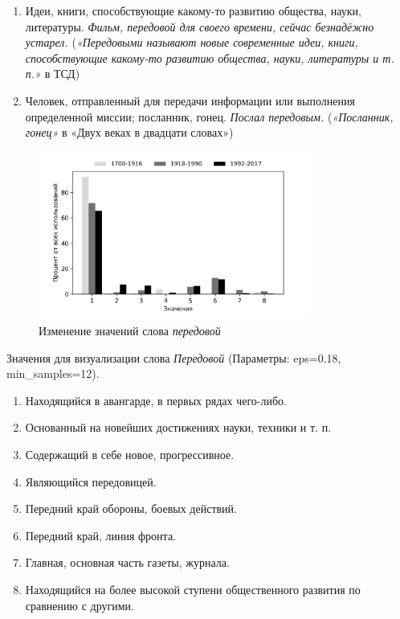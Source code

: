 \begin{enumerate}
    \item Идеи, книги, способствующие какому-то развитию общества, науки, литературы. \textit{Фильм, передовой для своего времени, сейчас безнадёжно устарел.}
(\textit{«Передовыми называют новые современные идеи, книги, способствующие какому-то развитию общества, науки, литературы и т. п.»} в ТСД)

    \item Человек, отправленный для передачи информации или выполнения определенной миссии; посланник, гонец. \textit{Послал передовым.}
(\textit{«Посланник, гонец»} в «Двух веках в двадцати словах»)
\end{enumerate}

\begin{figure}[H]
	\centering
	\includegraphics[width=0.8\textwidth]{img/visualizations/peredovoj_minimal}
	\caption{Изменение значений слова \textit{передовой}}
	\label{fig:Передовой}
\end{figure}

Значения для визуализации слова \textit{Передовой} (Параметры: eps=0.18, min\_samples=12).

\begin{enumerate}
    \item Находящийся в авангарде, в первых рядах чего-либо.
    \item Основанный на новейших достижениях науки, техники и т. п.
    \item Содержащий в себе новое, прогрессивное.
    \item Являющийся передовицей.
    \item Передний край обороны, боевых действий.
    \item Передний край, линия фронта.
    \item Главная, основная часть газеты, журнала.
    \item Находящийся на более высокой ступени общественного развития по сравнению с другими.
\end{enumerate}

